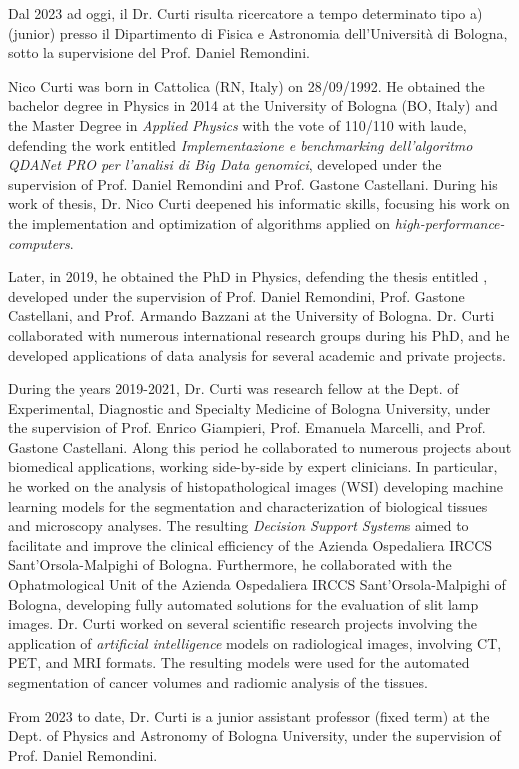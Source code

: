 {  Dal 2023 ad oggi, il Dr. Curti risulta ricercatore a tempo determinato tipo a) (junior) presso il Dipartimento di Fisica e Astronomia dell'Università di Bologna, sotto la supervisione del Prof. Daniel Remondini.

} {

  Nico Curti was born in Cattolica (RN, Italy) on 28/09/1992.
  He obtained the bachelor degree in Physics in 2014 at the University of Bologna (BO, Italy) and the Master Degree in \emph{Applied Physics} with the vote of 110/110 with laude, defending the work entitled \emph{Implementazione e benchmarking dell'algoritmo QDANet PRO per l'analisi di Big Data genomici}, developed under the supervision of Prof. Daniel Remondini and Prof. Gastone Castellani.
  During his work of thesis, Dr. Nico Curti deepened his informatic skills, focusing his work on the implementation and optimization of algorithms applied on \emph{high-performance-computers}.

  Later, in 2019, he obtained the PhD in Physics, defending the thesis entitled , developed under the supervision of Prof. Daniel Remondini, Prof. Gastone Castellani, and Prof. Armando Bazzani at the University of Bologna.
  Dr. Curti collaborated with numerous international research groups during his PhD, and he developed applications of data analysis for several academic and private projects.

  During the years 2019-2021, Dr. Curti was research fellow at the Dept. of Experimental, Diagnostic and Specialty Medicine of Bologna University, under the supervision of Prof. Enrico Giampieri, Prof. Emanuela Marcelli, and Prof. Gastone Castellani.
  Along this period he collaborated to numerous projects about biomedical applications, working side-by-side by expert clinicians.
  In particular, he worked on the analysis of histopathological images (WSI) developing machine learning models for the segmentation and characterization of biological tissues and microscopy analyses.
  The resulting \emph{Decision Support System}s aimed to facilitate and improve the clinical efficiency of the Azienda Ospedaliera IRCCS Sant'Orsola-Malpighi of Bologna.
  Furthermore, he collaborated with the Ophatmological Unit of the Azienda Ospedaliera IRCCS Sant'Orsola-Malpighi of Bologna, developing fully automated solutions for the evaluation of slit lamp images.
  Dr. Curti worked on several scientific research projects involving the application of \emph{artificial intelligence} models on radiological images, involving CT, PET, and MRI formats.
  The resulting models were used for the automated segmentation of cancer volumes and radiomic analysis of the tissues.

  From 2023 to date, Dr. Curti is a junior assistant professor (fixed term) at the Dept. of Physics and Astronomy of Bologna University, under the supervision of Prof. Daniel Remondini.
}
